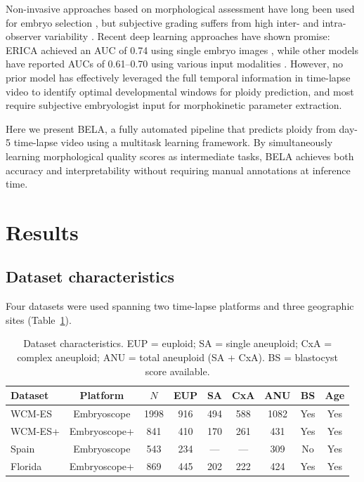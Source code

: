 \documentclass[11pt]{article}
\begin{document}
Non-invasive approaches based on morphological assessment have long been used for embryo selection \citep{gardner2015, meseguer2011}, but subjective grading suffers from high inter- and intra-observer variability \citep{rubio2014}. Recent deep learning approaches have shown promise: ERICA achieved an AUC of 0.74 using single embryo images \citep{barnes2023}, while other models have reported AUCs of 0.61--0.70 using various input modalities \citep{liao2021, tran2019}. However, no prior model has effectively leveraged the full temporal information in time-lapse video to identify optimal developmental windows for ploidy prediction, and most require subjective embryologist input for morphokinetic parameter extraction.

Here we present BELA, a fully automated pipeline that predicts ploidy from day-5 time-lapse video using a multitask learning framework. By simultaneously learning morphological quality scores as intermediate tasks, BELA achieves both accuracy and interpretability without requiring manual annotations at inference time.

\section{Results}

\subsection{Dataset characteristics}

Four datasets were used spanning two time-lapse platforms and three geographic sites (Table~\ref{tab:datasets}).

\begin{table}[H]
\centering
\caption{Dataset characteristics. EUP = euploid; SA = single aneuploid; CxA = complex aneuploid; ANU = total aneuploid (SA + CxA). BS = blastocyst score available.}
\label{tab:datasets}
\begin{tabular}{lcccccccc}
\toprule
\textbf{Dataset} & \textbf{Platform} & \textbf{$N$} & \textbf{EUP} & \textbf{SA} & \textbf{CxA} & \textbf{ANU} & \textbf{BS} & \textbf{Age} \\
\midrule
WCM-ES & Embryoscope & 1998 & 916 & 494 & 588 & 1082 & Yes & Yes \\
WCM-ES+ & Embryoscope+ & 841 & 410 & 170 & 261 & 431 & Yes & Yes \\
Spain & Embryoscope & 543 & 234 & --- & --- & 309 & No & Yes \\
Florida & Embryoscope+ & 869 & 445 & 202 & 222 & 424 & Yes & Yes \\
\bottomrule
\end{tabular}
\end{table}
\end{document}
